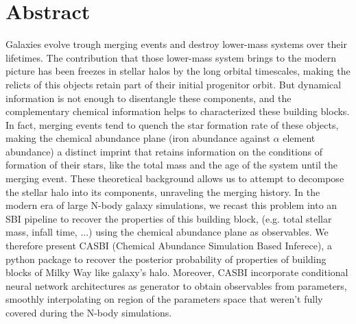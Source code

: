\chapter{Abstract}
Galaxies evolve trough merging events and destroy lower-mass systems over their lifetimes. The contribution that those lower-mass system brings to 
the modern picture has been freezes in stellar halos by the long orbital timescales, making the relicts of this objects retain part of 
their initial progenitor orbit. But dynamical information is not enough to disentangle these components, and the complementary chemical information 
helps to characterized these building blocks. In fact, merging events tend to quench the star formation rate of these objects, making the chemical 
abundance plane (iron abundance against $\alpha$ element abundance) a distinct imprint that retains information on the conditions of formation of their stars, like the total mass and 
the age of the system until the merging event. These theoretical background allows us to attempt to decompose the stellar halo into its components, 
unraveling the merging history. In the modern era of large N-body galaxy simulations, we recast this problem into an SBI pipeline to recover the 
properties of this building block, (e.g. total stellar mass, infall time, ...) using the chemical abundance plane as observables. We therefore present CASBI 
(Chemical Abundance Simulation Based Inferece), a python package to recover the posterior probability of properties of building blocks of Milky Way 
like galaxy's halo. Moreover, CASBI incorporate conditional neural network architectures as generator to obtain observables from parameters, smoothly interpolating on region of the parameters space that weren't fully covered during the N-body simulations.